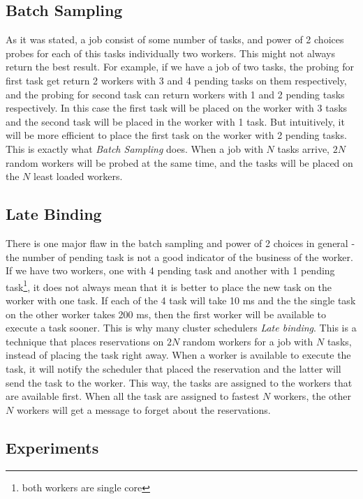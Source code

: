 \documentclass[11pt]{article}
\begin{document}
        
    \subsection{Batch Sampling}
    
    	As it was stated, a job consist of some number of tasks, and power of 2 choices probes for each of this tasks individually two workers. This might not always return the best result. For example, if we have a job of two tasks, the probing for first task get return 2 workers with 3 and 4 pending tasks on them respectively, and the probing for second task can return workers with 1 and 2 pending tasks respectively. In this case the first task will be placed on the worker with 3 tasks and the second task will be placed in the worker with 1 task. But intuitively, it will be more efficient to place the first task on the worker with 2 pending tasks. This is exactly what \textit{Batch Sampling} does. When a job with $N$ tasks arrive, $2N$ random workers will be probed at the same time, and the tasks will be placed on the $N$ least loaded workers.


    \subsection{Late Binding}
    
    	There is one major flaw in the batch sampling and power of 2 choices in general - the number of pending task is not a good indicator of the business of the worker. If we have two workers, one with 4 pending task and another with 1 pending task\footnote{both workers are single core}, it does not always mean that it is better to place the new task on the worker with one task. If each of the 4 task will take 10 ms and the the single task on the other worker takes 200 ms, then the first worker will be available to execute a task sooner. This is why many cluster schedulers \textit{Late binding}. This is a technique that places reservations on $2N$ random workers for a job with $N$ tasks, instead of placing the task right away. When a worker is available to execute the task, it will notify the scheduler that placed the reservation and the latter will send the task to the worker. This way, the tasks are assigned to the workers that are available first. When all the task are assigned to fastest $N$ workers, the other $N$ workers will get a message to forget about the reservations.


    \subsection{Experiments}
    
\end{document}
